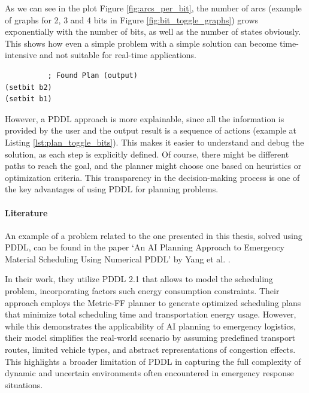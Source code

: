 As we can see in the plot Figure \ref{fig:arcs_per_bit}, the number of arcs (example
of graphs for 2, 3 and 4 bits in Figure \ref{fig:bit_toggle_graphs}) grows exponentially
with the number of bits, as well as the number of states obviously. This shows how
even a simple problem with a simple solution can become time-intensive and not suitable
for real-time applications.

\vspace{10mm}
\begin{codewindow}
    \begin{lstlisting}
          ; Found Plan (output)
(setbit b2)
(setbit b1)
\end{lstlisting}
\end{codewindow}
\vspace{10mm}

However, a PDDL approach is more explainable, since all the information is
provided by the user and the output result is a sequence of actions (example at Listing
\ref{lst:plan_toggle_bits}). This makes it easier to understand and debug the solution,
as each step is explicitly defined. Of course, there might be different paths to
reach the goal, and the planner might choose one based on heuristics or optimization
criteria. This transparency in the decision-making process is one of the key
advantages of using PDDL for planning problems.

\paragraph{Literature}
An example of a problem related to the one presented in this thesis, solved
using PDDL, can be found in the paper `An AI Planning Approach to Emergency
Material Scheduling Using Numerical PDDL' by Yang et al. \cite{Yang2022}.

In their work, they utilize PDDL 2.1 that allows to model the scheduling problem,
incorporating factors such energy consumption constraints. Their approach employs
the Metric-FF planner to generate optimized scheduling plans that minimize total
scheduling time and transportation energy usage. However, while this demonstrates
the applicability of AI planning to emergency logistics, their model simplifies
the real-world scenario by assuming predefined transport routes, limited vehicle
types, and abstract representations of congestion effects. This highlights a broader
limitation of PDDL in capturing the full complexity of dynamic and uncertain environments
often encountered in emergency response situations.

